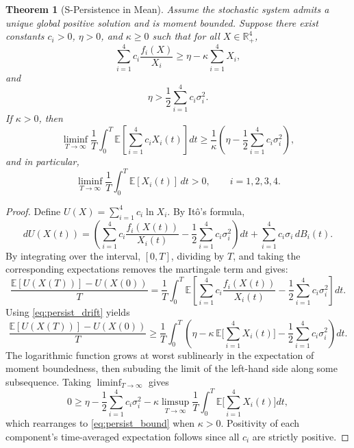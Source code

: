 \documentclass[10pt,a4paper]{amsart}
\newtheorem{theorem}{Theorem}
\begin{document}
\begin{theorem}[S-Persistence in Mean]\label{thm:P-S in Mean}
    Assume the stochastic system admits a unique global positive solution and is moment bounded. Suppose there exist constants $c_i>0$, $\eta>0$, and $\kappa\ge 0$ such that for all $X\in\mathbb{R}_+^4$,
\begin{equation}\label{eq:persist_drift}
\sum_{i=1}^4 c_i\frac{f_i(X)}{X_i}\ge \eta-\kappa\sum_{i=1}^4 X_i,
\end{equation}
and
\begin{equation}\label{eq:persist_noise}
\eta>\frac{1}{2}\sum_{i=1}^4 c_i\sigma_i^2.
\end{equation}
If $\kappa>0$, then
\begin{equation}\label{eq:persist_bound}
\liminf_{T\to\infty}\frac{1}{T}\int_0^T
\mathbb{E}\left[\sum_{i=1}^4 c_iX_i(t)\right]dt
\ge \frac{1}{\kappa}\left(\eta-\frac{1}{2}\sum_{i=1}^4 c_i\sigma_i^2\right),
\end{equation}
and in particular,
\[
\liminf_{T\to\infty}\frac{1}{T}\int_0^T \mathbb{E}[X_i(t)]\,dt>0,\qquad i=1,2,3,4.
\]
\end{theorem}

\begin{proof}
Define $U(X)=\sum_{i=1}^4 c_i\ln X_i$. By It\^o's formula,
\begin{equation}\label{eq:Ito_U}
dU(X(t))
=\left(\sum_{i=1}^4 c_i\frac{f_i(X(t))}{X_i(t)}
-\frac{1}{2}\sum_{i=1}^4 c_i\sigma_i^2\right)dt
+\sum_{i=1}^4 c_i\sigma_i\,dB_i(t).
\end{equation}
By integrating over the interval, $[0,T]$, dividing by $T$, and taking the corresponding expectations removes the martingale term and gives:
\[
\frac{\mathbb{E}[U(X(T))]-U(X(0))}{T}
=\frac{1}{T}\int_0^T
\mathbb{E}\left[
\sum_{i=1}^4 c_i\frac{f_i(X(t))}{X_i(t)}
-\frac{1}{2}\sum_{i=1}^4 c_i\sigma_i^2
\right]dt.
\]
Using \eqref{eq:persist_drift} yields
\[
\frac{\mathbb{E}[U(X(T))]-U(X(0))}{T}
\ge
\frac{1}{T}\int_0^T
\left(
\eta-\kappa\,\mathbb{E}\Big[\sum_{i=1}^4 X_i(t)\Big]
-\frac{1}{2}\sum_{i=1}^4 c_i\sigma_i^2
\right)dt.
\]
The logarithmic function grows at worst sublinearly in the expectation of moment boundedness, then subuding the limit of the left-hand side along some subsequence. Taking $\liminf_{T\to\infty}$ gives
\[
0\ge \eta-\frac{1}{2}\sum_{i=1}^4 c_i\sigma_i^2
-\kappa\limsup_{T\to\infty}\frac{1}{T}\int_0^T
\mathbb{E}\Big[\sum_{i=1}^4 X_i(t)\Big]dt,
\]
which rearranges to \eqref{eq:persist_bound} when $\kappa>0$. Positivity of each component’s time-averaged expectation follows since all $c_i$ are strictly positive.
\end{proof}
\end{document}
